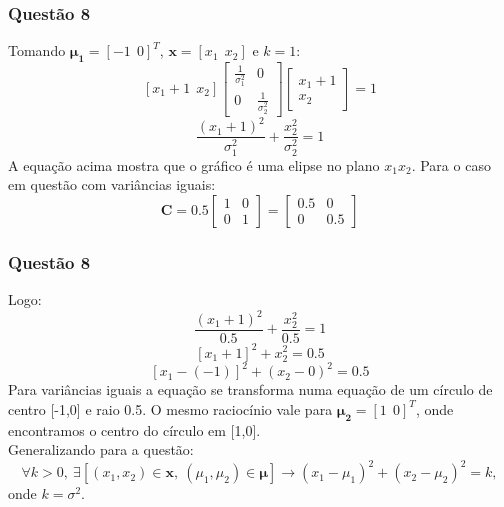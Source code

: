 \documentclass{beamer}\usepackage[]{graphicx}\usepackage[]{color}
\begin{document}
		\begin{frame}
			\frametitle{Questão 8}
			Tomando $\boldsymbol{\mu_{1}} = [-1~~0]^{T}$,  $\boldsymbol{x} = [x_{1}~~ x_{2}]$ e $k = 1$:
			$$
				[x_{1} + 1 ~~ x_{2}]
				\begin{bmatrix}
				\frac{1}{\sigma_{1}^{2}}&0\\0&\frac{1}{\sigma_{2}^{2}}
				\end{bmatrix}
				\begin{bmatrix}
					x_{1} + 1 \\ x_{2}
				\end{bmatrix} = 1$$
				$$\frac{(x_{1} + 1)^{2}}{\sigma_{1}^{2}} + \frac{x_{2}^{2}}{\sigma_{2}^{2}} = 1$$
				A equação acima mostra que o gráfico é uma elipse no plano $x_{1}x_{2}$.  Para o caso em questão com variâncias iguais:
				$$\boldsymbol{C} = 0.5\begin{bmatrix}
					1&0\\0&1
				\end{bmatrix} = 
				\begin{bmatrix}
					0.5&0\\0&0.5
				\end{bmatrix}$$
		\end{frame}
		
		\begin{frame}
			\frametitle{Questão 8}
			Logo:
			$$\frac{(x_{1} + 1)^{2}}{0.5} + \frac{x_{2}^{2}}{0.5} = 1$$
			$$[x_{1} + 1]^{2} + x_{2}^{2} = 0.5$$
			$$[x_{1} - (-1)]^{2} + (x_{2} - 0)^{2} = 0.5$$
			Para variâncias iguais a equação se transforma numa equação de um círculo  de centro [-1,0] e raio 0.5.  O mesmo raciocínio vale para $\boldsymbol{\mu_{2}} = [1~~0]^{T}$, onde encontramos o centro do círculo em [1,0].\\
			
			Generalizando para a questão:
			$$\forall k > 0,~ \exists[(x_{1},x_{2}) \in \boldsymbol{x}, ~(\mu_{1},\mu_{2}) \in \boldsymbol{\mu}] \rightarrow (x_{1} - \mu_{1})^{2} + (x_{2} - \mu_{2})^2 = k,$$ 
			onde $k = \sigma^{2}$.
		\end{frame}
		
\end{document}
